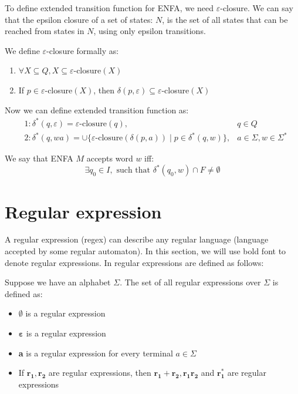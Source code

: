 \documentclass{ctuthesis}
\begin{document}
To define extended transition function for ENFA, we need $\varepsilon$-closure. We can say that the epsilon closure of a set of states: $N$, is the set of all states that can be reached from states in $N$, using only epsilon transitions. 

We define $\varepsilon$-closure formally as:
\begin{enumerate}
	\item $\forall X \subseteq Q, X \subseteq \varepsilon$-closure$(X)$
	\item If $p \in \varepsilon$-closure$(X)$, then $\delta(p, \varepsilon) \subseteq \varepsilon$-closure$(X)$
\end{enumerate}

Now we can define extended transition function as:
\begin{align*}
	&1: \delta^*(q, \varepsilon) = \varepsilon\text{-closure}(q), &q \in Q \\
	&2: \delta^*(q, wa) = \cup\{\varepsilon\text{-closure}(\delta(p, a)) \mid p \in \delta^*(q, w)\}, &a \in \Sigma, w \in \Sigma^*
\end{align*}

We say that ENFA $M$ accepts word $w$ iff:
\begin{equation*}
	\exists q_0 \in I, \text{ such that } \delta^*(q_0, w) \cap F \ne \emptyset
\end{equation*}

\section{Regular expression}
\label{sec:regex-def}
A regular expression (regex) can describe any regular language (language accepted by some regular automaton). In this section, we will use bold font to denote regular expressions. In \cite{demlova} regular expressions are defined as follows:

Suppose we have an alphabet $\Sigma$. The set of all regular expressions over $\Sigma$ is defined as:
\begin{itemize}
	\item $\mathbf{\emptyset}$ is a regular expression
	\item $\mathbf{\varepsilon}$ is a regular expression
	\item \textbf{a} is a regular expression for every terminal $a \in \Sigma$
	\item If $\mathbf{r_1}, \mathbf{r_2}$ are regular expressions, then $\mathbf{r_1+r_2}, \mathbf{r_1r_2}$ and $\mathbf{r_1^*}$ are regular expressions
\end{itemize}
\end{document}
